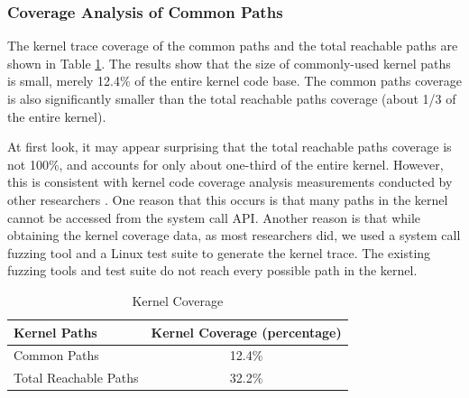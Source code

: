 \subsubsection{Coverage Analysis of Common Paths}

The kernel trace coverage of the common paths and the total reachable paths
are shown in Table \ref{table:kernel_coverage}. 
The results show that the size of commonly-used kernel paths is small,
merely 12.4\% of the entire kernel code base. 
The common paths coverage is also significantly smaller than the total
reachable paths coverage 
(about 1/3 of the entire kernel).

At first look, it may appear surprising that the total reachable paths
coverage is not 100\%, 
and accounts for only about one-third of the entire kernel.  However, 
this is consistent with kernel code coverage analysis 
measurements conducted by other researchers \cite{LTP-Coverage}.
One reason that this occurs is that many paths 
in the kernel cannot be accessed from the system call API. Another reason
is that 
while obtaining the kernel coverage data, as most researchers did, we used
a system call fuzzing tool 
and a Linux test suite to generate the kernel trace. The existing fuzzing
tools and test suite do not reach every possible path in the kernel.


\begin{table}
\centering
\scriptsize
\begin{tabular}{|l|c|}
  \hline
  \textbf{Kernel Paths} & \textbf{Kernel Coverage (percentage)} \\
  \hline \hline
  Common Paths & 12.4\% \\
  \hline
  Total Reachable Paths & 32.2\% \\
  \hline
\end{tabular}
\caption {Kernel Coverage}
\label{table:kernel_coverage}
\end{table}

